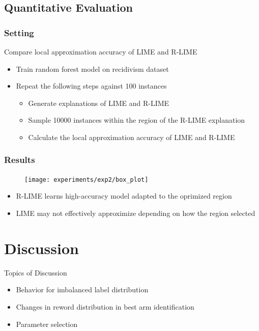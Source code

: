 \documentclass[aspectratio=169]{slide-en}
\begin{document}
\subsection{Quantitative Evaluation}

\subsubsection{Setting}

\begin{frame}{}
  Compare local approximation accuracy of LIME and R-LIME
  \begin{itemize}
    \item Train random forest model on recidivism dataset
    \item Repeat the following steps against 100 instances
          \begin{itemize}
            \item Generate explanations of LIME and R-LIME
            \item Sample 10000 instances within the region of
                  the R-LIME explanation
            \item Calculate the local approximation accuracy of LIME and R-LIME
          \end{itemize}
  \end{itemize}
\end{frame}

\subsubsection{Results}
\begin{frame}{}
  \begin{figure}
    \texttt{[image: experiments/exp2/box\_plot]}
  \end{figure}
  \begin{itemize}
    \item R-LIME learns high-accuracy model adapted to the oprimized region
    \item LIME may not effectively approximize depending on how the region selected
  \end{itemize}
\end{frame}

\section{Discussion}

\begin{frame}{}
  Topics of Discussion
  \begin{itemize}
    \item Behavior for imbalanced label distribution
    \item Changes in reword distribution in best arm identification
    \item Parameter selection
  \end{itemize}
\end{frame}
\end{document}
